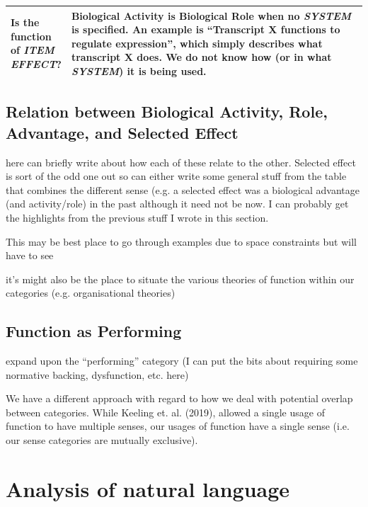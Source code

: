 \documentclass{article}
\begin{document}
\begin{landscape}
\begin{table}
\begin{tabular}{|p{0.17\linewidth}|p{0.97\linewidth}|}
    \hline
    Is the function of \emph{ITEM} \emph{EFFECT}? &  Biological Activity is Biological Role when no \emph{SYSTEM} is specified. An example is ``Transcript X functions to regulate expression'', which simply describes what transcript X does. We do not know how (or in what \emph{SYSTEM}) it is being used. \\
    \hline
  \end{tabular}
\end{table}
\end{landscape}

\subsection{Relation between Biological Activity, Role, Advantage, and Selected Effect}
\label{sec:relat-betw-funct}

here can briefly write about how each of these relate to the other. Selected effect is sort of the odd one out so can either write some general stuff from the table that combines the different sense (e.g. a selected effect was a biological advantage (and activity/role) in the past although it need not be now. I can probably get the highlights from the previous stuff I wrote in this section.

This may be best place to go through examples due to space constraints but will have to see

it's might also be the place to situate the various theories of function within our categories (e.g. organisational theories)

\subsection{Function as Performing}
\label{sec:funct-as-perf}

expand upon the ``performing'' category (I can put the bits about requiring some normative backing, dysfunction, etc. here)





We have a different approach with regard to how we deal with potential overlap between categories.
While Keeling et. al. (2019), allowed a single usage of function to have multiple senses, our usages of function have a single sense (i.e. our sense categories are mutually exclusive).


\section{Analysis of natural language}
\label{sec:analys-natur-lang}
\end{document}
